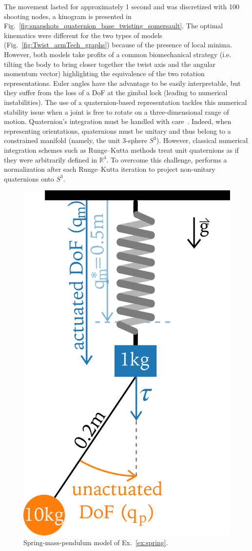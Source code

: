 The movement lasted for approximately 1 second and was discretized with 100 shooting nodes, a kinogram is presented in Fig.~\ref{fig:snapshots_quaternion_base_twisting_somersault}.
The optimal kinematics were different for the two types of models (Fig.~\ref{fig:Twist_armTech_graphs}) because of the presence of local minima.
However, both models take profits of a common biomechanical strategy (i.e. tilting the body to bring closer together the twist axis and the angular momentum vector) highlighting the equivalence of the two rotation representations.
Euler angles have the advantage to be easily interpretable, but they suffer from the loss of a DoF at the gimbal lock (leading to numerical instabilities).
The use of a quaternion-based representation tackles this numerical stability issue when a joint is free to rotate on a three-dimensional range of motion.
Quaternion's integration must be handled with care~\cite{bailly2020optimal}.
Indeed, when representing orientations, quaternions must be unitary and thus belong to a constrained manifold (namely, the unit 3-sphere $S^3$). 
However, classical numerical integration schemes such as Runge–Kutta methods treat unit quaternions as if they were arbitrarily defined in $\mathbb{R}^4$.
To overcome this challenge, \bioptim performs a normalization after each Runge–Kutta iteration to project non-unitary quaternions onto $S^3$.

\begin{figure}[t!]
\centering
\includegraphics[width=0.35\columnwidth]{figures/Mass_Pendulum_Model_2.png}
\caption{Spring-mass-pendulum model of Ex.~\ref{ex:spring}.}
\label{fig:Mass_Pendulum_Model}
\vspace*{-0.5cm}
\end{figure}

